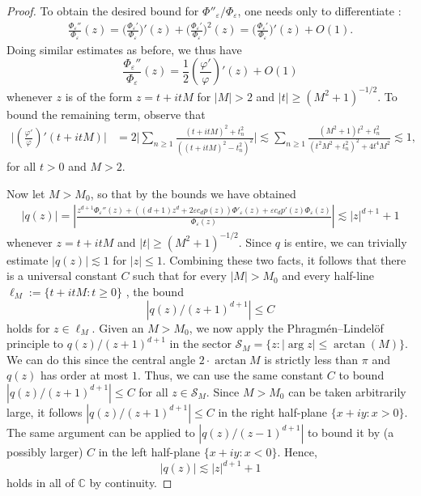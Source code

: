 \documentclass[10pt,a4paper]{amsart}
\renewcommand{\P}{\Phi}
\renewcommand{\S}{\mathcal{S}}
\newcommand{\cp}{\mathbb{C}} %
\newcommand{\ep}{\varepsilon}
\newcommand{\p}{\varphi}
\begin{document}
\begin{proof}
To obtain the desired bound for $\P''_\ep/ \P_\ep$, one needs only to differentiate :
\begin{align*}
    \frac{\P_\ep''}{\P_\ep}(z)
    = \bigg(\frac{\P_\ep'}{\P_\ep}\bigg)'(z)+ \bigg(\frac{\P_\ep'}{\P_\ep}\bigg)^2(z) = \bigg(\frac{\P_\ep'}{\P_\ep}\bigg)'(z) + O(1).
\end{align*}
Doing similar estimates as before, we thus have
\begin{equation*}
    \frac{\P_\ep''}{\P_\ep}(z)= \frac{1}{2}  \left(\frac{\p'}{\p}\right)' (z) +O(1)
\end{equation*}
whenever $z$ is of the form $z = t + itM$ for $|M| > 2$ and $|t| \geq (M^2 + 1)^{-1/2}$.  To bound the remaining term, observe that
\begin{align*}
    \Bigg|\left(\frac{\p'}{\p}\right)' (t + itM)\Bigg| &= 2 \Bigg|\sum_{n \geq 1} \frac{(t+ itM)^2 + t_n^2}{((t+ itM)^2 - t_n^2)^2} \Bigg|
    \lesssim \sum_{n\geq 1} \frac{(M^2 + 1)t^2 + t_n^2  }{(t^2 M^2 + t_n^2 )^2+ 4t^4 M^2}  \lesssim 1,
\end{align*}
for all $ t > 0 $ and $M > 2$. 

Now let $M > M_0$, so that by the bounds we have obtained 
\begin{align*}
     |q(z)| = \left|\frac{z^{d+1}\P_\ep''(z) + ((d+1)z^d+2\ep c_d p(z))\P'_\ep(z) + \ep c_d p'(z) \P_\ep(z) }{\P_\ep (z)} \right|\lesssim  |z|^{d+1} + 1
\end{align*}
whenever $z = t + itM$ and $|t| \geq (M^2 + 1)^{-1/2}$. Since $q$ is entire, we can trivially estimate $|q(z)| \lesssim 1$ for $|z | \leq 1$. Combining these two facts, it follows that there is a universal constant $C$ such that for every $|M| > M_0$ and every half-line $\ell_M := \{t + itM : t \geq 0\}$ , the bound 
$$|q(z)/(z+1)^{d+1}| \leq C$$
holds for $ z \in \ell_M.$ Given an $M > M_0$, we now apply the Phragmén--Lindelöf principle to $q(z)/(z+1)^{d+1}$ in the sector $\S_M = \{ z : |\arg z| \leq \arctan(M) \}$. We can do this since the central angle $2 \cdot\arctan M$ is strictly less than $\pi$ and $q(z)$ has order at most $1$. Thus, we can use the same constant $C$ to bound $|q(z)/(z+1)^{d+1}| \leq C$ for all $z \in \S_M$. Since $M > M_0$ can be taken arbitrarily large, it follows $|q(z)/(z+1)^{d+1}| \leq C$ in the right half-plane $\{x+iy: x > 0 \}$. The same argument can be applied to $|q(z)/(z-1)^{d+1}|$ to bound it by (a possibly larger) $C$ in the left half-plane $\{x+iy: x < 0 \}$. Hence,
\begin{equation*}
    |q(z)| \lesssim |z|^{d+1} + 1
\end{equation*}
holds in all of $\cp$ by continuity.
\end{proof}
\end{document}
